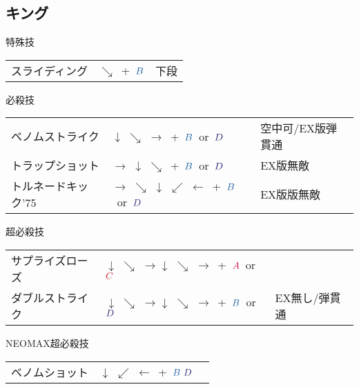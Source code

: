 \documentclass[a4j,11pt]{jarticle}
\def\A{\textcolor{Acolor}{A}}
\def\C{\textcolor{Ccolor}{C}}
\def\B{\textcolor{Bcolor}{B}}
\def\D{\textcolor{Dcolor}{D}}
\def\hado{$\downarrow$ $\searrow$ $\rightarrow$}%
\def\tatsu{$\downarrow$ $\swarrow$ $\leftarrow$}%
\def\syoryu{$\rightarrow$ $\downarrow$ $\searrow$}%
\def\gyakuyoga{$\rightarrow$ $\searrow$ $\downarrow$ $\swarrow$ $\leftarrow$}%
\begin{document}
\subsection{キング}
\begin{itembox}[l]{特殊技}
\begin{tabular}{lll}
スライディング&$\searrow$\ +\ $\B$&下段%
\end{tabular}
\end{itembox}
\begin{itembox}[l]{必殺技}
\begin{tabular}{lll}
ベノムストライク&\hado\ +\ $\B$\ or\ $\D$&空中可/EX版弾貫通\\%
トラップショット&\syoryu\ +\ $\B$\ or\ $\D$&EX版無敵\\%
トルネードキック'75&\gyakuyoga\ +\ $\B$\ or\ $\D$&EX版版無敵%
\end{tabular}
\end{itembox}
\begin{itembox}[l]{超必殺技}
\begin{tabular}{lll}
サプライズローズ&\hado\hado\ +\ $\A$\ or\ $\C$&\\%
ダブルストライク&\hado\hado\ +\ $\B$\ or\ $\D$&EX無し/弾貫通%
\end{tabular}
\end{itembox}
\begin{itembox}[l]{NEOMAX超必殺技}
\begin{tabular}{lll}
ベノムショット&\tatsu\ +\ $\B\ \D$&%
\end{tabular}
\end{itembox}
\newpage
\end{document}
